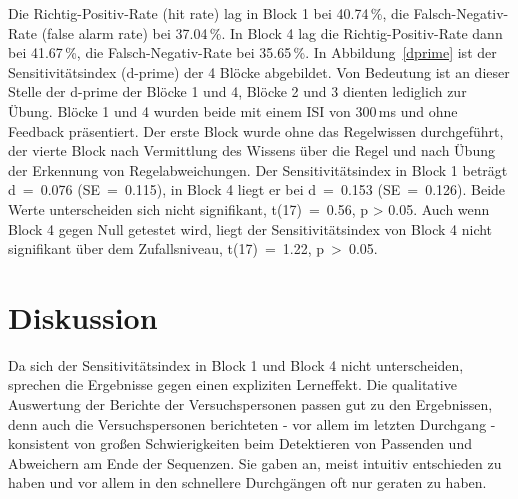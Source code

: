 \documentclass[doc,a4paper,12pt]{apa6}
\begin{document}
Die Richtig-Positiv-Rate (hit rate) lag in Block 1 bei 40.74\,\%, die Falsch-Negativ-Rate (false alarm rate) bei 37.04\,\%. In Block 4 lag die Richtig-Positiv-Rate dann bei 41.67\,\%, die Falsch-Negativ-Rate bei 35.65\,\%. In Abbildung~\ref{dprime} ist der Sensitivitätsindex (d-prime) der 4 Blöcke abgebildet. Von Bedeutung ist an dieser Stelle der d-prime der Blöcke 1 und 4, Blöcke 2 und 3 dienten lediglich zur Übung. Blöcke 1 und 4 wurden beide mit einem ISI von 300\,ms und ohne Feedback präsentiert. Der erste Block wurde ohne das Regelwissen durchgeführt, der vierte Block nach Vermittlung des Wissens über die Regel und nach Übung der Erkennung von Regelabweichungen. Der Sensitivitätsindex in Block 1 beträgt d~=~0.076 (SE~=~0.115), in Block 4 liegt er bei d~=~0.153 (SE~=~0.126). Beide Werte unterscheiden sich nicht signifikant, t(17)~=~0.56, p > 0.05. Auch wenn Block 4 gegen Null getestet wird, liegt der Sensitivitätsindex von Block 4 nicht signifikant über dem Zufallsniveau, t(17)~=~1.22, p~>~0.05.


\section{Diskussion}

Da sich der Sensitivitätsindex in Block 1 und Block 4 nicht unterscheiden, sprechen die Ergebnisse gegen einen expliziten Lerneffekt. Die qualitative Auswertung der Berichte der Versuchspersonen passen gut zu den Ergebnissen, denn auch die Versuchspersonen berichteten - vor allem im letzten Durchgang - konsistent von großen Schwierigkeiten beim Detektieren von Passenden und Abweichern am Ende der Sequenzen. Sie gaben an, meist intuitiv entschieden zu haben und vor allem in den schnellere Durchgängen oft nur geraten zu haben.
\end{document}
